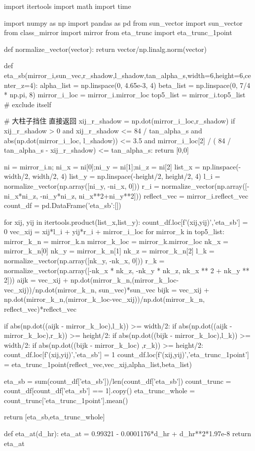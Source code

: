 \documentclass{article}
\numberwithin{equation}{subsection}
\begin{document}
\begin{python}
import itertools
import math
import time

import numpy as np
import pandas as pd
from sun_vector import sun_vector
from class_mirror import mirror
from eta_trunc import eta_trunc_1point


def normalize_vector(vector):
    return vector/np.linalg.norm(vector)

def eta_sb(mirror_i,sun_vec,r_shadow,l_shadow,tan_alpha_s,width=6,height=6,center_z=4):
    alpha_list = np.linspace(0, 4.65e-3, 4)
    beta_list = np.linspace(0, 7/4 * np.pi, 8)
    mirror_i_loc = mirror_i.mirror_loc
    top5_list = mirror_i.top5_list       # exclude itself

    # 大柱子挡住 直接返回
    xij_r_shadow = np.dot(mirror_i_loc,r_shadow)
    if xij_r_shadow > 0 and xij_r_shadow <= 84 / tan_alpha_s and abs(np.dot(mirror_i_loc, l_shadow)) <= 3.5 and mirror_i_loc[2] / (
            84 / tan_alpha_s - xij_r_shadow) <= tan_alpha_s:
        return [0,0]

    ni = mirror_i.n; ni_x = ni[0];ni_y = ni[1];ni_z = ni[2]
    list_x = np.linspace(-width/2, width/2, 4)
    list_y = np.linspace(-height/2, height/2, 4)
    l_i = normalize_vector(np.array([ni_y, -ni_x, 0]))
    r_i = normalize_vector(np.array([-ni_x*ni_z, -ni_y*ni_z, ni_x**2+ni_y**2]))
    reflect_vec = mirror_i.reflect_vec
    count_df = pd.DataFrame({'eta_sb':[]})


    for xij, yij in itertools.product(list_x,list_y):
        count_df.loc[f'({xij},{yij})','eta_sb'] = 0
        vec_xij = xij*l_i + yij*r_i + mirror_i_loc
        for mirror_k in top5_list:
            mirror_k_n = mirror_k.n
            mirror_k_loc = mirror_k.mirror_loc
            nk_x = mirror_k_n[0]
            nk_y = mirror_k_n[1]
            nk_z = mirror_k_n[2]
            l_k = normalize_vector(np.array([nk_y, -nk_x, 0]))
            r_k = normalize_vector(np.array([-nk_x * nk_z, -nk_y * nk_z, nk_x ** 2 + nk_y ** 2]))
            aijk = vec_xij + np.dot(mirror_k_n,(mirror_k_loc-vec_xij))/np.dot(mirror_k_n, sun_vec)*sun_vec
            bijk = vec_xij + np.dot(mirror_k_n,(mirror_k_loc-vec_xij))/np.dot(mirror_k_n, reflect_vec)*reflect_vec

            if abs(np.dot((aijk - mirror_k_loc),l_k)) >= width/2:
                if abs(np.dot((aijk - mirror_k_loc),r_k)) >= height/2:
                    if abs(np.dot((bijk - mirror_k_loc),l_k)) >= width/2:
                        if abs(np.dot((bijk - mirror_k_loc) ,r_k)) >= height/2:
                            count_df.loc[f'({xij},{yij})','eta_sb'] = 1
                            count_df.loc[f'({xij},{yij})','eta_trunc_1point'] = eta_trunc_1point(reflect_vec,vec_xij,alpha_list,beta_list)


    eta_sb = sum(count_df['eta_sb'])/len(count_df['eta_sb'])
    count_trunc = count_df[count_df['eta_sb'] == 1].copy()
    eta_trunc_whole = count_trunc['eta_trunc_1point'].mean()

    return [eta_sb,eta_trunc_whole]


def eta_at(d_hr):
    eta_at = 0.99321 - 0.0001176*d_hr + d_hr**2*1.97e-8
    return eta_at


\end{python}
\end{document}
